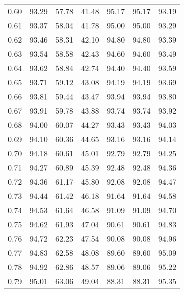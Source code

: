 \begin{tabular}{|c|c|c|c|c|c|c|}
      0.60 &     93.29 &     57.78 &      41.48 &   95.17 &      95.17 &         93.19 \\
      0.61 &     93.37 &     58.04 &      41.78 &   95.00 &      95.00 &         93.29 \\
      0.62 &     93.46 &     58.31 &      42.10 &   94.80 &      94.80 &         93.39 \\
      0.63 &     93.54 &     58.58 &      42.43 &   94.60 &      94.60 &         93.49 \\
      0.64 &     93.62 &     58.84 &      42.74 &   94.40 &      94.40 &         93.59 \\
      0.65 &     93.71 &     59.12 &      43.08 &   94.19 &      94.19 &         93.69 \\
      0.66 &     93.81 &     59.44 &      43.47 &   93.94 &      93.94 &         93.80 \\
      0.67 &     93.91 &     59.78 &      43.88 &   93.74 &      93.74 &         93.92 \\
      0.68 &     94.00 &     60.07 &      44.27 &   93.43 &      93.43 &         94.03 \\
      0.69 &     94.10 &     60.36 &      44.65 &   93.16 &      93.16 &         94.14 \\
      0.70 &     94.18 &     60.61 &      45.01 &   92.79 &      92.79 &         94.25 \\
      0.71 &     94.27 &     60.89 &      45.39 &   92.48 &      92.48 &         94.36 \\
      0.72 &     94.36 &     61.17 &      45.80 &   92.08 &      92.08 &         94.47 \\
      0.73 &     94.44 &     61.42 &      46.18 &   91.64 &      91.64 &         94.58 \\
      0.74 &     94.53 &     61.64 &      46.58 &   91.09 &      91.09 &         94.70 \\
      0.75 &     94.62 &     61.93 &      47.04 &   90.61 &      90.61 &         94.83 \\
      0.76 &     94.72 &     62.23 &      47.54 &   90.08 &      90.08 &         94.96 \\
      0.77 &     94.83 &     62.58 &      48.08 &   89.60 &      89.60 &         95.09 \\
      0.78 &     94.92 &     62.86 &      48.57 &   89.06 &      89.06 &         95.22 \\
      0.79 &     95.01 &     63.06 &      49.04 &   88.31 &      88.31 &         95.35 \\

\end{tabular}
